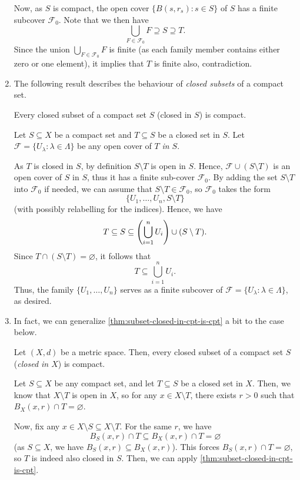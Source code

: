 \begin{enumerate}
\begin{pf}
Now, as \(S\) is compact, the open cover \(\{B(s,r_s):s\in S\}\) of \(S\) has a
finite subcover \(\mathcal{F}_0\). Note that we then have
\[
\bigcup_{F\in\mathcal{F}_0}F\supseteq S\supseteq T.
\]
Since the union \(\displaystyle \bigcup_{F\in\mathcal{F}_0}F\) is finite (as
each family member contains either zero or one element), it implies that \(T\)
is finite also, contradiction.
\end{pf}
\item The following result describes the behaviour of \emph{closed subsets} of
a compact set.
\begin{theorem}
\label{thm:subset-closed-in-cpt-is-cpt}
Every closed subset of a compact set \(S\) (closed in \(S\)) is compact.
\end{theorem}
\begin{pf}
Let \(S\subseteq X\) be a compact set and \(T\subseteq S\) be a closed set in
\(S\). Let \(\mathcal{F}=\{U_{\lambda}:\lambda\in\Lambda\}\) be any open cover
of \(T\) \emph{in \(S\)}.

As \(T\) is closed in \(S\), by definition \(S\setminus T\) is open in \(S\).
Hence, \(\mathcal{F}\cup(S\setminus T)\) is an open cover of \(S\) in \(S\),
thus it has a finite sub-cover \(\mathcal{F}_0\). By adding the set
\(S\setminus T\) into \(\mathcal{F}_0\) if needed, we can assume that
\(S\setminus T\in\mathcal{F}_0\), so \(\mathcal{F}_0\) takes the form
\[
\{U_1,\dotsc,U_n,S\setminus T\}
\]
(with possibly relabelling for the indices). Hence, we have
\[
T\subseteq S\subseteq \qty(\bigcup_{i=1}^{n}U_i)\cup (S\setminus T).
\]
Since \(T\cap (S\setminus T)=\varnothing\), it follows that
\[
T\subseteq \bigcup_{i=1}^{n}U_i.
\]
Thus, the family \(\{U_1,\dotsc,U_n\}\) serves as a finite subcover of
\(\mathcal{F}=\{U_{\lambda}:\lambda\in\Lambda\}\), as desired.
\end{pf}
\item In fact, we can generalize \cref{thm:subset-closed-in-cpt-is-cpt} a bit to
the case below.

\begin{corollary}
\label{cor:closed-subset-of-cpt-is-cpt}
Let \((X,d)\) be a metric space.  Then, every closed subset of a compact set
\(S\) (\emph{closed in \(X\)}) is compact.
\end{corollary}
\begin{pf}
Let \(S\subseteq X\) be any compact set, and let \(T\subseteq S\) be a closed
set in \(X\). Then, we know that \(X\setminus T\) is open in \(X\), so for any
\(x\in X\setminus T\), there exists \(r>0\) such that \(B_X(x,r)\cap
T=\varnothing\).

Now, fix any \(x\in X\setminus S\subseteq X\setminus T\). For the same \(r\),
we have
\[
B_S(x,r)\cap T\subseteq B_X(x,r)\cap T=\varnothing
\]
(as \(S\subseteq X\), we have \(B_S(x,r)\subseteq B_X(x,r)\)).
This forces \(B_S(x,r)\cap T=\varnothing\), so \(T\) is indeed also closed in
\(S\).  Then, we can apply \cref{thm:subset-closed-in-cpt-is-cpt}.
\end{pf}
\end{enumerate}
